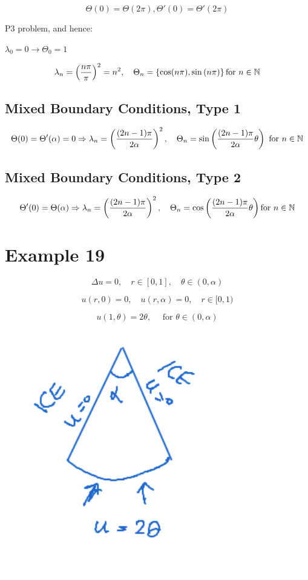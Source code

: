 \documentclass{article}
\begin{document}
$$\Theta(0) = \Theta(2 \pi), \Theta'(0) = \Theta'(2 \pi)$$

P3 problem, and hence:

$\lambda_0 = 0 \to \Theta_0 = 1$

$$\lambda_n = \left( \frac{n \pi}{\pi} \right)^2 = n^2, \quad \Theta_n = \left\{ \cos(n \pi), \sin \left( n \pi \right) \right\} \text {for } n \in \mathbb{N}$$

\subsection{Mixed Boundary Conditions, Type 1}

$$\Theta(0) = \Theta'(\alpha) = 0 \Rightarrow \lambda_n = \left( \frac{(2n-1) \pi}{2 \alpha} \right)^2, \quad \Theta_n = \sin \left( \frac{(2n-1) \pi}{2 \alpha} \theta \right) \text { for } n \in \mathbb{N}$$

\subsection{Mixed Boundary Conditions, Type 2}

$$\Theta'(0) = \Theta(\alpha) \Rightarrow \lambda_n = \left( \frac{(2n-1) \pi}{2 \alpha} \right)^2, \quad \Theta_n = \cos \left( \frac{(2n-1) \pi}{2 \alpha} \theta \right) \text {for } n \in \mathbb{N}$$

\section{Example 19}

$$\Delta u = 0, \quad r \in [0,1], \quad \theta \in (0, \alpha)$$

$$u(r,0) = 0, \quad u(r, \alpha) = 0, \quad r \in [0,1)$$

$$u(1, \theta) = 2 \theta, \quad \text { for } \theta \in (0, \alpha)$$

\begin{center}
    \includegraphics[width = 0.6 \textwidth]{4.png}
\end{center}
\end{document}
